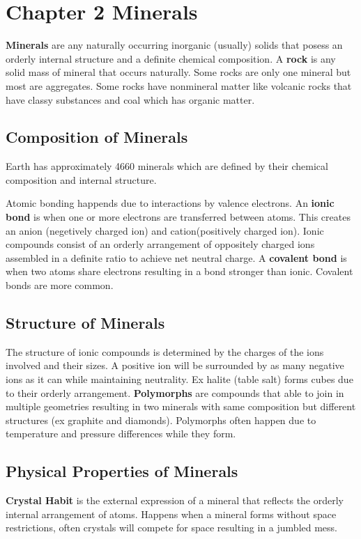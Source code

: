 \documentclass{article}
\begin{document}
\section{Chapter 2 Minerals} %
\label{sec:chapter_2}
\textbf{Minerals} are any naturally occurring inorganic (usually) solids that posess an orderly internal structure and a definite chemical composition. A \textbf{rock} is any solid mass of mineral that occurs naturally. Some rocks are only one mineral but most are aggregates. Some rocks have nonmineral matter like volcanic rocks that have classy substances and coal which has organic matter.

\subsection{Composition of Minerals} %
\label{sub:composition_of_minerals}
Earth has approximately 4660 minerals which are defined by their chemical composition and internal structure.

Atomic bonding happends due to interactions by valence electrons. An \textbf{ionic bond} is when one or more electrons are transferred between atoms. This creates an anion (negetively charged ion) and cation(positively charged ion). Ionic compounds consist of an orderly arrangement of oppositely charged ions assembled in a definite ratio to achieve net neutral charge. A \textbf{covalent bond} is when two atoms share electrons resulting in a bond stronger than ionic. Covalent bonds are more common.

\subsection{Structure of Minerals} %
\label{sub:structure_of_minerals}
The structure of ionic compounds is determined by the charges of the ions involved and their sizes. A positive ion will be surrounded by as many negative ions as it can while maintaining neutrality. Ex halite (table salt) forms cubes due to their orderly arrangement. \textbf{Polymorphs} are compounds that able to join in multiple geometries resulting in two minerals with same composition but different structures (ex graphite and diamonds). Polymorphs often happen due to temperature and pressure differences while they form.

\subsection{Physical Properties of Minerals} %
\label{sub:physical_properties_of_minerals}
\textbf{Crystal Habit} is the external expression of a mineral that reflects the orderly internal arrangement of atoms. Happens when a mineral forms without space restrictions, often crystals will compete for space resulting in a jumbled mess.
\end{document}
